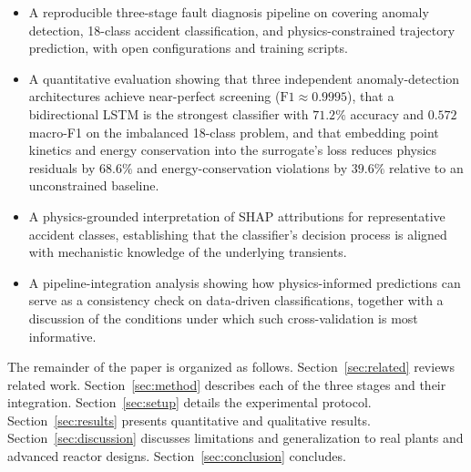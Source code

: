 \begin{itemize}[leftmargin=*]
    \item A reproducible three-stage fault diagnosis pipeline on \nppad{} covering anomaly detection, 18-class accident classification, and physics-constrained trajectory prediction, with open configurations and training scripts.
    \item A quantitative evaluation showing that three independent anomaly-detection architectures achieve near-perfect screening ($\mathrm{F1} \approx 0.9995$), that a bidirectional LSTM is the strongest classifier with $71.2\%$ accuracy and $0.572$ macro-F1 on the imbalanced 18-class problem, and that embedding point kinetics and energy conservation into the surrogate's loss reduces physics residuals by $68.6\%$ and energy-conservation violations by $39.6\%$ relative to an unconstrained baseline.
    \item A physics-grounded interpretation of SHAP attributions for representative accident classes, establishing that the classifier's decision process is aligned with mechanistic knowledge of the underlying transients.
    \item A pipeline-integration analysis showing how physics-informed predictions can serve as a consistency check on data-driven classifications, together with a discussion of the conditions under which such cross-validation is most informative.
\end{itemize}

The remainder of the paper is organized as follows. Section~\ref{sec:related} reviews related work. Section~\ref{sec:method} describes each of the three stages and their integration. Section~\ref{sec:setup} details the experimental protocol. Section~\ref{sec:results} presents quantitative and qualitative results. Section~\ref{sec:discussion} discusses limitations and generalization to real plants and advanced reactor designs. Section~\ref{sec:conclusion} concludes.
